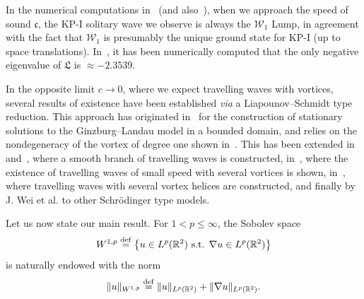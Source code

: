 \documentclass[10pt]{amsart}
\theoremstyle{definition}\newtheorem{defi}[theo]{Definition}\newtheorem{rema}[theo]{Remark}\newtheorem{exam}[theo]{Example}\newtheorem{exem}[theo]{Example}\newtheorem{nota}[theo]{Notation}
\newcommand*\R{\mathbb R}
\newcommand*\ddef{\stackrel{\rm def}{=}}
\newcommand*\BW{\mathcal{W}}
\newcommand*\cs{{\mathfrak c}}
\newcommand{\fkL}{\mathfrak{L}}
\newcommand*\ii{\infty}
\newcommand*\ls{\leqslant }
\begin{document}
In the numerical computations in~\cite{JR} (and also~\cite{ChiSch15}), when we approach the speed of sound $ \cs $, the KP-I solitary wave we observe is always the $ \BW_1 $ Lump, in agreement with the fact that $ \BW_1 $ is presumably the unique ground state for KP-I (up to space translations). In~\cite{ChiSch_Morse}, it has been numerically computed that the only negative eigenvalue of $ \fkL $ is $ \approx - 2.3539 $.

In the opposite limit $ c \to 0 $, where we expect travelling waves with vortices, several results of existence have been established {\it via} a Liapounov--Schmidt type reduction. This approach has originated in~\cite{delPino_variational} for the construction of stationary solutions to the Ginzburg--Landau model in a bounded domain, and relies on the nondegeneracy of the vortex of degree one shown in~\cite{delPino_vortex}. This has been extended in~\cite{Chi_Pac_2} and~\cite{Chi_Pac_1}, where a smooth branch of travelling waves is constructed, in~\cite{Liu_Wei-multi}, where the existence of travelling waves of small
speed with several vortices is shown, in~\cite{Dav_delPi_Med_Rod}, where travelling waves with several vortex helices are constructed, and finally by J. Wei et al. to other Schr\"odinger type models.



Let us now state our main result. For $ 1 < p \ls \ii $, the Sobolev space
\[
W^{1,p} \ddef \left\{ u \in L^p (\R^2) \text{ s.t. } \nabla u \in L^{p} (\R^2) \right\}
\]
is naturally endowed with the norm
\[
\| u \|_{ W^{1,p} } \ddef
\| u \|_{ L^p (\R^2) } + \| \nabla u \|_{ L^{p} (\R^2) }.
\]
\end{document}
